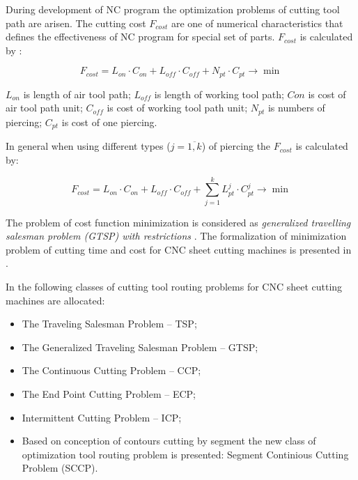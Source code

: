 \documentclass[runningheads]{llncs}
\begin{document}
During development of NC program the optimization problems of cutting tool path are arisen.
The cutting cost $F_{cost}$ are one of numerical characteristics
that defines the effectiveness of NC program for special set of parts.
$F_{cost}$ is calculated by \cite{ru04}:

\begin{equation}
F_{cost} =
L_{on} \cdot C_{on} +
L_{off} \cdot C_{off} +
N_{pt} \cdot C_{pt}
\to \min
\label{cost}
\end{equation}

$L_{on}$ is length of air tool path;
$L_{off}$ is length of working tool path;
$C{on}$ is cost of air tool path unit;
$C_{off}$ is cost of working tool path unit;
$N_{pt}$ is numbers of piercing;
$C_{pt}$ is cost of one piercing.

In general when using different types ($j = \overline{1, k}$) of piercing
the $F_{cost}$ is calculated by:

\begin{equation}
  F_{cost} =
  L_{on} \cdot C_{on} +
  L_{off} \cdot C_{off} +
  \sum_{j=1}^k L_{pt}^j \cdot C_{pt}^j
  \to \min
  \label{cost-n}
\end{equation}

The problem of cost function minimization is considered as
\textit{generalized travelling salesman problem (GTSP) with restrictions}
\cite{ru04,ru05}.
The formalization of minimization problem of cutting time and cost
for CNC sheet cutting machines is presented in \cite{ru04}.

In \cite{Dewil2016Nov,Hoeft1997Sep}
the following classes of cutting tool routing problems
for CNC sheet cutting machines are allocated:

\begin{itemize}

\item The Traveling Salesman Problem – TSP;

\item The Generalized Traveling Salesman Problem – GTSP;

\item The Continuous Cutting Problem – CCP;

\item The End Point Cutting Problem – ECP;

\item Intermittent Cutting Problem – ICP;

\item Based on conception of contours cutting by segment \cite{Petunin2015Nov}
the new class of optimization tool routing problem is presented:
Segment Continious Cutting Problem (SCCP).

\end{itemize}
\end{document}
